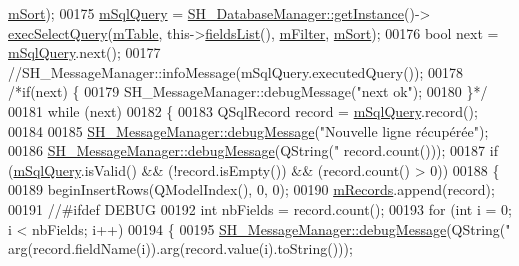 \begin{DoxyCode}
      \hyperlink{classSH__SqlDataModel_a7e36fd116b7cb50e949ee56af0c31772}{mSort});
00175             \hyperlink{classSH__SqlDataModel_a54f0cf057e3200f6b199508958e43fec}{mSqlQuery} = \hyperlink{classSH__DatabaseManager_a31198eb4de0f8b18e3fa0eed09f24d19}{SH\_DatabaseManager::getInstance}()->
      \hyperlink{classSH__DatabaseManager_ab8f9850cb68444ab9a4e613b36a3b044}{execSelectQuery}(\hyperlink{classSH__SqlDataModel_a88b8738a0d2803c94295c90c83d65f32}{mTable}, this->\hyperlink{classSH__SqlDataModel_a571bdc1f9592bd13f98fd748563d46c0}{fieldsList}(), 
      \hyperlink{classSH__SqlDataModel_af83c15ae3ad1dc4617dd58f2a852a1e2}{mFilter}, \hyperlink{classSH__SqlDataModel_a7e36fd116b7cb50e949ee56af0c31772}{mSort});
00176             \textcolor{keywordtype}{bool} next = \hyperlink{classSH__SqlDataModel_a54f0cf057e3200f6b199508958e43fec}{mSqlQuery}.next();
00177             \textcolor{comment}{//SH\_MessageManager::infoMessage(mSqlQuery.executedQuery());}
00178             \textcolor{comment}{/*if(next) \{}
00179 \textcolor{comment}{                SH\_MessageManager::debugMessage("next ok");}
00180 \textcolor{comment}{            \}*/}
00181             \textcolor{keywordflow}{while} (next)
00182             \{
00183                 QSqlRecord record = \hyperlink{classSH__SqlDataModel_a54f0cf057e3200f6b199508958e43fec}{mSqlQuery}.record();
00184 
00185                 \hyperlink{classSH__MessageManager_a379f2aa0a590a5add34dbe91f98b2ff7}{SH\_MessageManager::debugMessage}(\textcolor{stringliteral}{"Nouvelle ligne récupérée"});
00186                 \hyperlink{classSH__MessageManager_a379f2aa0a590a5add34dbe91f98b2ff7}{SH\_MessageManager::debugMessage}(QString(\textcolor{stringliteral}{"%
      record.count()));
00187                 \textcolor{keywordflow}{if} (\hyperlink{classSH__SqlDataModel_a54f0cf057e3200f6b199508958e43fec}{mSqlQuery}.isValid() && (!record.isEmpty()) && (record.count() > 0))
00188                 \{
00189                     beginInsertRows(QModelIndex(), 0, 0);
00190                     \hyperlink{classSH__SqlDataModel_aa58096989daac3cd3fdea5e6dd4f27ee}{mRecords}.append(record);
00191 \textcolor{comment}{//#ifdef DEBUG}
00192                     \textcolor{keywordtype}{int} nbFields = record.count();
00193                     \textcolor{keywordflow}{for} (\textcolor{keywordtype}{int} i = 0; i < nbFields; i++)
00194                     \{
00195                         \hyperlink{classSH__MessageManager_a379f2aa0a590a5add34dbe91f98b2ff7}{SH\_MessageManager::debugMessage}(QString(\textcolor{stringliteral}{"%
      arg(record.fieldName(i)).arg(record.value(i).toString()));
}}
\end{DoxyCode}
